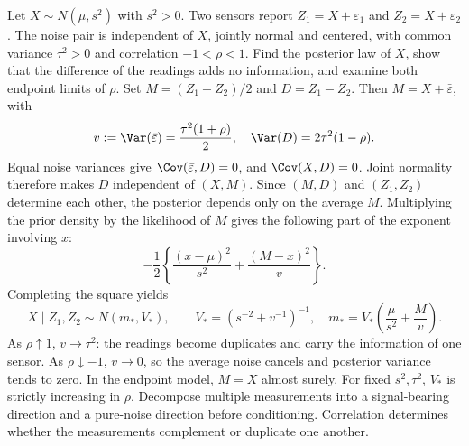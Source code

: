 Let $X\sim N(\mu,s^2)$ with $s^2>0$. Two sensors report $Z_1=X+\varepsilon_1$ and $Z_2=X+\varepsilon_2$. The noise pair is independent of $X$, jointly normal and centered, with common variance $\tau^2>0$ and correlation $-1<\rho<1$. Find the posterior law of $X$, show that the difference of the readings adds no information, and examine both endpoint limits of $\rho$.
\solution Set $M=(Z_1+Z_2)/2$ and $D=Z_1-Z_2$. Then $M=X+\bar\varepsilon$, with
\[
 v:=\Var(\bar\varepsilon)=\frac{\tau^2(1+\rho)}2,
 \quad \Var(D)=2\tau^2(1-\rho).
\]
Equal noise variances give $\Cov(\bar\varepsilon,D)=0$, and $\Cov(X,D)=0$. Joint normality therefore makes $D$ independent of $(X,M)$. Since $(M,D)$ and $(Z_1,Z_2)$ determine each other, the posterior depends only on the average $M$.
Multiplying the prior density by the likelihood of $M$ gives the following part of the exponent involving $x$:
\[
 -\frac12\left\{\frac{(x-\mu)^2}{s^2}
                  +\frac{(M-x)^2}{v}\right\}.
\]
Completing the square yields
\[
 X\mid Z_1,Z_2\sim N(m_*,V_*),\qquad
 V_*=(s^{-2}+v^{-1})^{-1},\quad
 m_*=V_*\left(\frac\mu{s^2}+\frac Mv\right).
\]
As $\rho\uparrow1$, $v\to\tau^2$: the readings become duplicates and carry the information of one sensor. As $\rho\downarrow-1$, $v\to0$, so the average noise cancels and posterior variance tends to zero. In the endpoint model, $M=X$ almost surely. For fixed $s^2,\tau^2$, $V_*$ is strictly increasing in $\rho$.
\insight Decompose multiple measurements into a signal-bearing direction and a pure-noise direction before conditioning. Correlation determines whether the measurements complement or duplicate one another.
